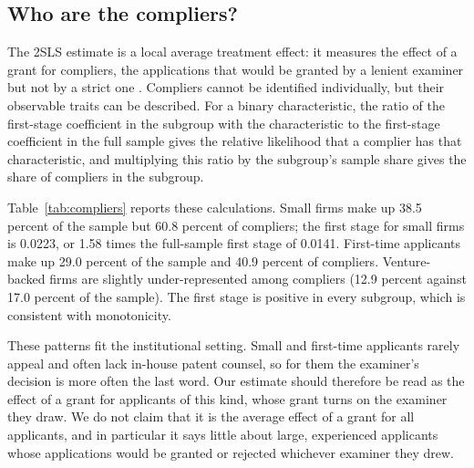 \documentclass[11pt]{article}
\begin{document}
\subsection{Who are the compliers?}
\label{sec:compliers}

The 2SLS estimate is a local average treatment effect: it measures the effect of a grant for compliers, the applications that would be granted by a lenient examiner but not by a strict one \citep{imbens1994}. Compliers cannot be identified individually, but their observable traits can be described. For a binary characteristic, the ratio of the first-stage coefficient in the subgroup with the characteristic to the first-stage coefficient in the full sample gives the relative likelihood that a complier has that characteristic, and multiplying this ratio by the subgroup's sample share gives the share of compliers in the subgroup.

Table~\ref{tab:compliers} reports these calculations. Small firms make up 38.5 percent of the sample but 60.8 percent of compliers; the first stage for small firms is 0.0223, or 1.58 times the full-sample first stage of 0.0141. First-time applicants make up 29.0 percent of the sample and 40.9 percent of compliers. Venture-backed firms are slightly under-represented among compliers (12.9 percent against 17.0 percent of the sample). The first stage is positive in every subgroup, which is consistent with monotonicity.

These patterns fit the institutional setting. Small and first-time applicants rarely appeal and often lack in-house patent counsel, so for them the examiner's decision is more often the last word. Our estimate should therefore be read as the effect of a grant for applicants of this kind, whose grant turns on the examiner they draw. We do not claim that it is the average effect of a grant for all applicants, and in particular it says little about large, experienced applicants whose applications would be granted or rejected whichever examiner they drew.
\end{document}
